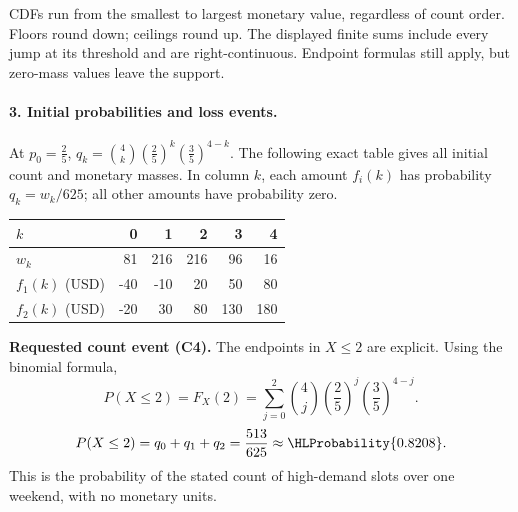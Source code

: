 CDFs run from the smallest to largest monetary value, regardless of count order. Floors round down; ceilings round up. The displayed finite sums include every jump at its threshold and are right-continuous. Endpoint formulas still apply, but zero-mass values leave the support.
\clearpage\paragraph{3. Initial probabilities and loss events.}
At $p_0=\frac{2}{5}$, $q_k=\binom{4}k(\frac{2}{5})^k(\frac{3}{5})^{4-k}$. The following exact table gives all initial count and monetary masses. In column $k$, each amount $f_i(k)$ has probability $q_k=w_k/625$; all other amounts have probability zero.
\begin{center}\begin{tabular}{lrrrrr}\toprule
$k$ & 0 & 1 & 2 & 3 & 4\\\midrule
$w_k$ & 81 & 216 & 216 & 96 & 16\\
$f_1(k)$ (USD) & -40 & -10 & 20 & 50 & 80\\
$f_2(k)$ (USD) & -20 & 30 & 80 & 130 & 180\\
\bottomrule\end{tabular}\end{center}
\textbf{Requested count event (C4).} The endpoints in $X\leq 2$ are explicit. Using the binomial formula,
\[P(X\leq 2)=F_X(2)=\sum_{j=0}^{2}\binom{4}j(\frac{2}{5})^j(\frac{3}{5})^{4-j}.\]
\[P(X\leq 2)=q_{0}+q_{1}+q_{2}=\frac{513}{625}\approx\HLProbability{0.8208}.\]
This is the probability of the stated count of high-demand slots over one weekend, with no monetary units.
\clearpage
